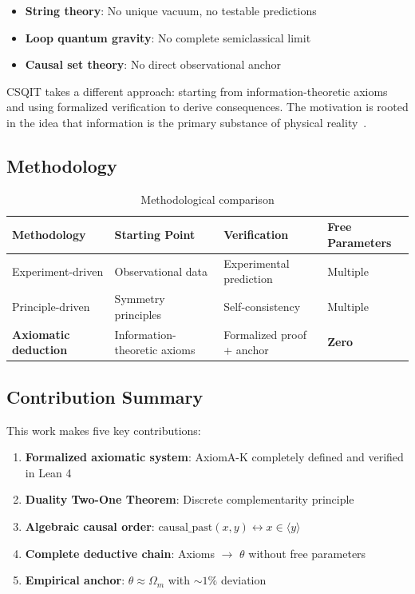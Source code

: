 \documentclass[aps,prd,twocolumn,nofootinbib,floatfix]{revtex4-2}
\begin{document}
\begin{itemize}
    \item \textbf{String theory}: No unique vacuum, no testable predictions
    \item \textbf{Loop quantum gravity}: No complete semiclassical limit
    \item \textbf{Causal set theory}: No direct observational anchor
\end{itemize}

CSQIT takes a different approach: starting from information-theoretic axioms and using formalized verification to derive consequences. The motivation is rooted in the idea that information is the primary substance of physical reality~\cite{Wheeler1989}.

\subsection{Methodology}

\begin{table}[h]
\centering
\begin{tabular}{llll}
\hline
Methodology & Starting Point & Verification & Free Parameters \\
\hline
Experiment-driven & Observational data & Experimental prediction & Multiple \\
Principle-driven & Symmetry principles & Self-consistency & Multiple \\
\textbf{Axiomatic deduction} & Information-theoretic axioms & Formalized proof + anchor & \textbf{Zero} \\
\hline
\end{tabular}
\caption{Methodological comparison}
\label{tab:methodology}
\end{table}

\subsection{Contribution Summary}

This work makes five key contributions:

\begin{enumerate}
    \item \textbf{Formalized axiomatic system}: AxiomA-K completely defined and verified in Lean 4
    \item \textbf{Duality Two-One Theorem}: Discrete complementarity principle
    \item \textbf{Algebraic causal order}: $\text{causal\_past}(x,y) \leftrightarrow x \in \langle y \rangle$
    \item \textbf{Complete deductive chain}: Axioms $\rightarrow$ $\theta$ without free parameters
    \item \textbf{Empirical anchor}: $\theta \approx \Omega_m$ with $\sim 1\%$ deviation
\end{enumerate}
\end{document}
